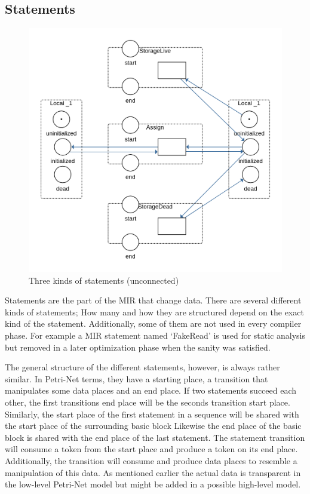 \subsection{Statements}
\begin{figure}
    \centering
    \includegraphics[width=.9\textwidth]{../diagrams/StatementsNet.png}
    \caption{Three kinds of statements (unconnected)}
    \label{statements_net}
\end{figure}
Statements are the part of the MIR that change data.
There are several different kinds of statements;
How many and how they are structured depend on the exact kind of the statement.
Additionally, some of them are not used in every compiler phase.
For example a MIR statement named `FakeRead' is used for static analysis but removed in a later optimization phase when the sanity was satisfied.

The general structure of the different statements, however, is always rather similar.
In Petri-Net terms, they have a starting place, a transition that manipulates some data places and an end place.
If two statements succeed each other, the first transitions end place will be the seconds transition start place.
Similarly, the start place of the first statement in a sequence will be shared with the start place of the surrounding basic block
Likewise the end place of the basic block is shared with the end place of the last statement.
The statement transition will consume a token from the start place and produce a token on its end place.
Additionally, the transition will consume and produce data places to resemble a manipulation of this data.
As mentioned earlier the actual data is transparent in the low-level Petri-Net model but might be added in a possible high-level model.

